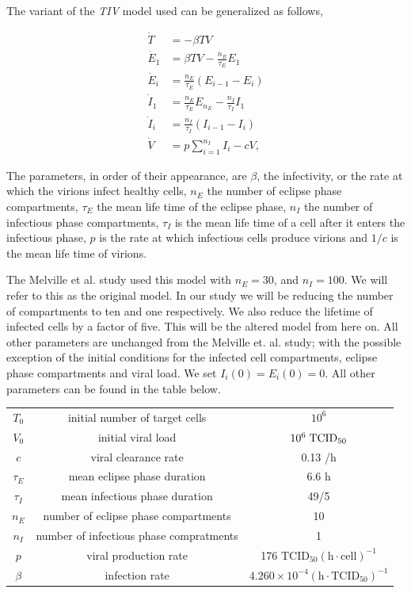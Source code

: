 \documentclass[a4paper,11pt]{article}
\begin{document}
The variant of the \textit{TIV} model used can be generalized as follows,

\begin{align*}
\dot{T} &= -\beta TV \\
\dot{E}_1 &= \beta TV - \frac{n_E}{\tau_E}E_1 \\
\dot{E}_i &= \frac{n_E}{\tau_E}(E_{i-1}-E_i) \\
\dot{I}_1 &= \frac{n_E}{\tau_E}E_{n_E}-\frac{n_I}{\tau_I}I_1\\
\dot{I}_i &= \frac{n_I}{\tau_I}(I_{i-1}-I_{i}) \\
\dot{V} &= p\sum_{i=1}^{n_I}I_i - cV,
\end{align*}

 The parameters, in order of their appearance, are $\beta$, the infectivity, or the rate at which the virions infect healthy cells, $n_E$ the number of eclipse phase compartments, $\tau_E$ the mean life time of the eclipse phase, $n_I$ the number of infectious phase compartments, $\tau_I$ is the mean life time of a cell after it enters the infectious phase, $p$ is the rate at which infectious cells produce virions and $1/c$ is the mean life time of virions.

The Melville et al. study used this model with $n_E =30$, and $n_I = 100$. We will refer to this as the original model. In our study we will be reducing the number of compartments to ten and one respectively. We also reduce the lifetime of infected cells by a factor of five. This will be the altered model from here on. All other parameters are unchanged from the Melville et. al. study; with the possible exception of the initial conditions for the infected cell compartments, eclipse phase compartments and viral load. We set $I_i(0)=E_i(0)=0$. All other parameters can be found in the table below.


\begin{center}
\begin{tabular}{ c c c }
 $T_0$ & initial number of target cells & $10^6$ \\
 $V_0$ & initial viral load & $10^6 \hspace{1mm} \mathrm{TCID}_{50}$ \\
 $c$ & viral clearance rate & 0.13 /h \\
 $\tau_E$ & mean eclipse phase duration & 6.6 h\\
 $\tau_I$ & mean infectious phase duration & 49/5\\
 $n_E$ & number of eclipse phase compartments & 10\\
 $n_I$ & number of infectious phase compratments & 1\\
 $p$ & viral production rate & 176 $\mathrm{TCID}_{50}(\mathrm{h \cdot cell})^{-1}$\\
 $\beta$ & infection rate & $4.260\times10^{-4} (\mathrm{h \cdot TCID_{50}})^{-1}$
\end{tabular}
\end{center}
\end{document}
